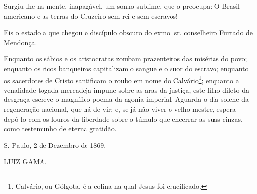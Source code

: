 Surgiu-lhe na mente, inapagável, um sonho sublime, que o preocupa: O
Brasil americano e as terras do Cruzeiro sem rei e sem escravos!

Eis o estado a que chegou o discípulo obscuro do exmo. sr. conselheiro
Furtado de Mendonça.

Enquanto os sábios e os aristocratas zombam prazenteiros das misérias do
povo; enquanto os ricos banqueiros capitalizam o sangue e o suor do
escravo; enquanto os sacerdotes de Cristo santificam o roubo em nome do
Calvário\footnote{Calvário, ou Gólgota, é a colina na qual Jesus foi
  crucificado.}; enquanto a
venalidade togada mercadeja impune sobre as aras da justiça, este filho
dileto da desgraça escreve o magnífico poema da agonia imperial. Aguarda
o dia solene da regeneração nacional, que há de vir; e, se já não viver
o velho mestre, espera depô-lo com os louros da liberdade sobre o túmulo
que encerrar as suas cinzas, como testemunho de eterna gratidão.

S. Paulo, 2 de Dezembro de 1869.

LUIZ GAMA.

\pagebreak
\mbox{}\vfill
\thispagestyle{empty}

